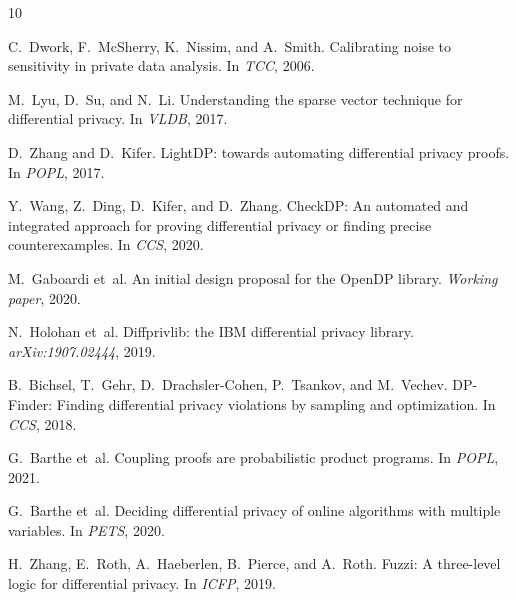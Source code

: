 \documentclass[sigplan,screen,nonacm]{acmart}
\begin{document}
\begin{thebibliography}{10}

C.~Dwork, F.~McSherry, K.~Nissim, and A.~Smith.
\newblock Calibrating noise to sensitivity in private data analysis.
\newblock In \emph{TCC}, 2006.

M.~Lyu, D.~Su, and N.~Li.
\newblock Understanding the sparse vector technique for differential privacy.
\newblock In \emph{VLDB}, 2017.

D.~Zhang and D.~Kifer.
\newblock LightDP: towards automating differential privacy proofs.
\newblock In \emph{POPL}, 2017.

Y.~Wang, Z.~Ding, D.~Kifer, and D.~Zhang.
\newblock CheckDP: An automated and integrated approach for proving
  differential privacy or finding precise counterexamples.
\newblock In \emph{CCS}, 2020.

M.~Gaboardi et~al.
\newblock An initial design proposal for the OpenDP library.
\newblock \emph{Working paper}, 2020.

N.~Holohan et~al.
\newblock Diffprivlib: the IBM differential privacy library.
\newblock \emph{arXiv:1907.02444}, 2019.

B.~Bichsel, T.~Gehr, D.~Drachsler-Cohen, P.~Tsankov, and M.~Vechev.
\newblock DP-Finder: Finding differential privacy violations by sampling and
  optimization.
\newblock In \emph{CCS}, 2018.

G.~Barthe et~al.
\newblock Coupling proofs are probabilistic product programs.
\newblock In \emph{POPL}, 2021.

G.~Barthe et~al.
\newblock Deciding differential privacy of online algorithms with multiple
  variables.
\newblock In \emph{PETS}, 2020.

H.~Zhang, E.~Roth, A.~Haeberlen, B.~Pierce, and A.~Roth.
\newblock Fuzzi: A three-level logic for differential privacy.
\newblock In \emph{ICFP}, 2019.

\end{thebibliography}
\end{document}
